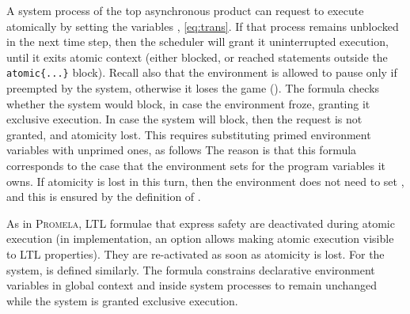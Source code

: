\documentclass[copyright]{eptcs}
\begin{document}
A system process of the top asynchronous product can request to execute atomically by setting the variables , \cref{eq:trans}.
If that process remains unblocked in the next time step, then the scheduler will grant it uninterrupted execution, until it exits atomic context (either blocked, or reached statements outside the \texttt{atomic\{...\}} block).
Recall also that the environment is allowed to pause only if preempted by the system, otherwise it loses the game ().
The formula  checks whether the system would block, in case the environment froze, granting it exclusive execution.
In case the system will block, then the request is not granted, and atomicity lost.
This requires substituting primed environment variables with unprimed ones, as follows
The reason is that this formula corresponds to the case that the environment sets  for the program variables it owns.
If atomicity is lost in this turn, then the environment does not need to set , and this is ensured by the definition of .

As in \textsc{Promela}, LTL formulae that express safety are deactivated during atomic execution (in implementation, an option allows making atomic execution visible to LTL properties).
They are re-activated as soon as atomicity is lost.
For the system,  is defined similarly.
The formula  constrains declarative environment variables in global context and inside system processes to remain unchanged while the system is granted exclusive execution.
\end{document}
